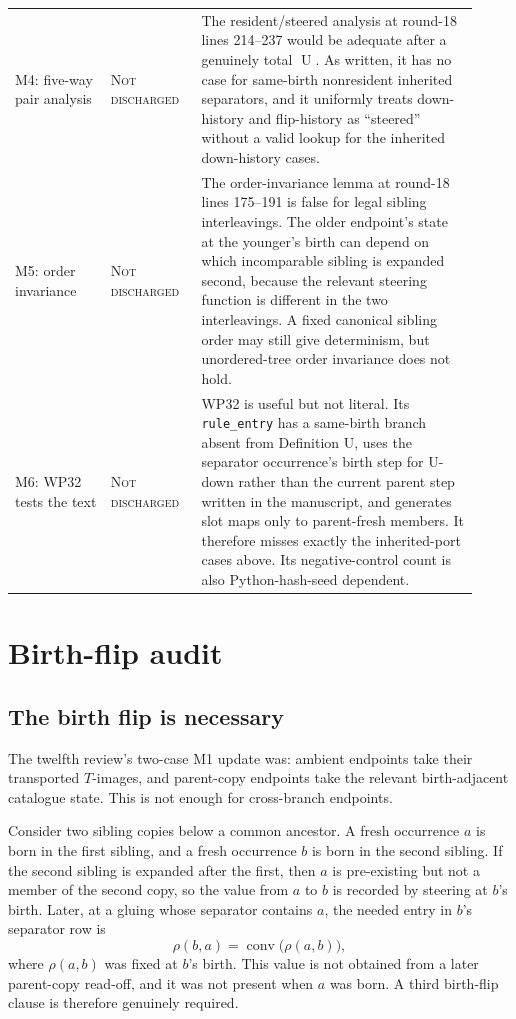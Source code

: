 \documentclass[11pt]{article}
\newcommand{\Uop}{\operatorname{U}}
\newcommand{\code}[1]{\texttt{#1}}
\newcommand{\status}[1]{\textsc{#1}}
\newcommand{\rhoR}{\rho}
\theoremstyle{remark}
\begin{document}
\begin{longtable}{>{\raggedright\arraybackslash}p{0.19\linewidth} >{\raggedright\arraybackslash}p{0.18\linewidth} >{\raggedright\arraybackslash}p{0.55\linewidth}}
\addlinespace
M4: five-way pair analysis & \status{Not discharged} & The resident/steered analysis at round-18 lines 214--237 would be adequate after a genuinely total $\Uop$.  As written, it has no case for same-birth nonresident inherited separators, and it uniformly treats down-history and flip-history as ``steered'' without a valid lookup for the inherited down-history cases. \\
\addlinespace
M5: order invariance & \status{Not discharged} & The order-invariance lemma at round-18 lines 175--191 is false for legal sibling interleavings.  The older endpoint's state at the younger's birth can depend on which incomparable sibling is expanded second, because the relevant steering function is different in the two interleavings.  A fixed canonical sibling order may still give determinism, but unordered-tree order invariance does not hold. \\
\addlinespace
M6: WP32 tests the text & \status{Not discharged} & WP32 is useful but not literal.  Its \code{rule\_entry} has a same-birth branch absent from Definition U, uses the separator occurrence's birth step for U-down rather than the current parent step written in the manuscript, and generates slot maps only to parent-fresh members.  It therefore misses exactly the inherited-port cases above.  Its negative-control count is also Python-hash-seed dependent. \\
\end{longtable}

\section{Birth-flip audit}

\subsection{The birth flip is necessary}

The twelfth review's two-case M1 update was: ambient endpoints take their transported $T$-images, and parent-copy endpoints take the relevant birth-adjacent catalogue state.  This is not enough for cross-branch endpoints.

Consider two sibling copies below a common ancestor.  A fresh occurrence $a$ is born in the first sibling, and a fresh occurrence $b$ is born in the second sibling.  If the second sibling is expanded after the first, then $a$ is pre-existing but not a member of the second copy, so the value from $a$ to $b$ is recorded by steering at $b$'s birth.  Later, at a gluing whose separator contains $a$, the needed entry in $b$'s separator row is
\[
  \rhoR(b,a)=\operatorname{conv}\bigl(\rhoR(a,b)\bigr),
\]
where $\rhoR(a,b)$ was fixed at $b$'s birth.  This value is not obtained from a later parent-copy read-off, and it was not present when $a$ was born.  A third birth-flip clause is therefore genuinely required.
\end{document}
